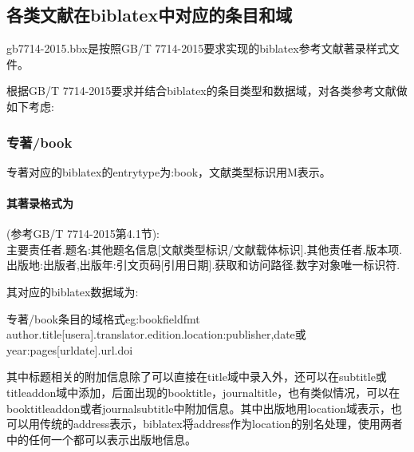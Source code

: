 
\subsection{各类文献在biblatex中对应的条目和域}\label{sec:numeric:data}
gb7714-2015.bbx是按照GB/T 7714-2015要求实现的biblatex参考文献著录样式文件。

根据GB/T 7714-2015要求并结合biblatex的条目类型和数据域，对各类参考文献做如下考虑:
\subsubsection{专著/book}
\begin{refentry}{}{}
专著对应的biblatex的entrytype为:book，文献类型标识用M表示。

\paragraph{其著录格式为}(参考GB/T 7714-2015第4.1节):\\
主要责任者.题名:其他题名信息[文献类型标识/文献载体标识].其他责任者.版本项.出版地:出版者,出版年:引文页码[引用日期].获取和访问路径.数字对象唯一标识符.
\end{refentry}

其对应的biblatex数据域为:
\begin{codetex}{专著/book条目的域格式}{eg:bookfieldfmt}
author.title[usera].translator.edition.location:publisher,date或year:pages[urldate].url.doi
\end{codetex}

其中标题相关的附加信息除了可以直接在title域中录入外，还可以在subtitle或titleaddon域中添加，后面出现的booktitle，journaltitle，也有类似情况，可以在booktitleaddon或者journalsubtitle中附加信息。其中出版地用location域表示，也可以用传统的address表示，biblatex将address作为location的别名处理，使用两者中的任何一个都可以表示出版地信息。


